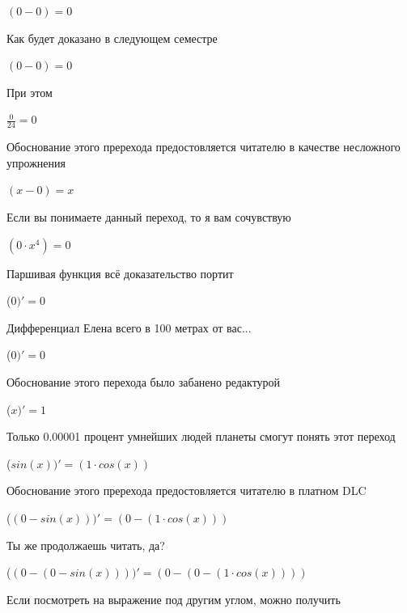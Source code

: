 \documentclass[12pt,a4paper,fleqn]{article}
\begin{document}
\begin{center}
\begin{center}
\begin{center}
\begin{center}
\begin{center}
\begin{center}
\begin{center}
\begin{center}
\begin{center}
\begin{center}
\begin{center}
\begin{center}$(0-0) = 0$\end{center}
Как будет доказано в следующем семестре

\begin{center}
\begin{center}$(0-0) = 0$\end{center}
При этом

\begin{center}
\begin{center}$\frac{0}{24} = 0$\end{center}
Обоснование этого пререхода предостовляется читателю в качестве несложного упрожнения

\begin{center}
$(x-0) = x$\end{center}
Если вы понимаете данный переход, то я вам сочувствую

\begin{center}
$(0 \cdot x^{4}) = 0$\end{center}
Паршивая функция всё доказательство портит\cite{link2}

\begin{center}
 ($0)'
  = 0$\end{center}
Дифференциал Елена всего в 100 метрах от вас...

\begin{center}
 ($0)'
  = 0$\end{center}
Обоснование этого перехода было забанено редактурой

\begin{center}
 ($x)'
  = 1$\end{center}
Только 0.00001 процент умнейших людей планеты смогут понять этот переход

\begin{center}
 ($sin(x))'
  = (1 \cdot cos(x))$\end{center}
Обоснование этого пререхода предостовляется читателю в платном DLC

\begin{center}
 ($(0-sin(x)))'
  = (0-(1 \cdot cos(x)))$\end{center}
Ты же продолжаешь читать, да?

\begin{center}
 ($(0-(0-sin(x))))'
  = (0-(0-(1 \cdot cos(x))))$\end{center}
Если посмотреть на выражение под другим углом, можно получить


\end{center}
\end{center}
\end{center}
\end{center}
\end{center}
\end{center}
\end{center}
\end{center}
\end{center}
\end{center}
\end{center}
\end{center}
\end{center}
\end{document}
